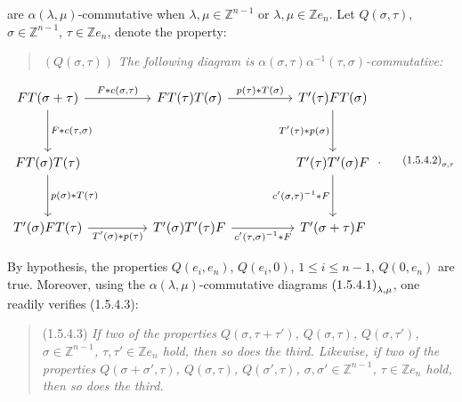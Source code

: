 %
are $\alpha(\lambda,\mu)$-commutative when
$\lambda,\mu\in\mathbb Z^{n-1}$ or
$\lambda,\mu\in\mathbb Z e_n$. Let $Q(\sigma,\tau)$,
$\sigma\in\mathbb Z^{n-1}$, $\tau\in\mathbb Z e_n$, denote the
property:

\begin{quote}
  \noindent\textup{$(Q(\sigma,\tau))$}\quad
  \emph{The following diagram is
  $\alpha(\sigma,\tau)\alpha^{-1}(\tau,\sigma)$-commutative:}
\end{quote}

\begin{equation}
  \resizebox{0.98\textwidth}{!}{%
    $\begin{tikzcd}[ampersand replacement=\&,column sep=4.5em,row sep=3.2em]
      FT(\sigma+\tau)
        \arrow[r,"{F*c(\sigma,\tau)}"]
        \arrow[d,"{F*c(\tau,\sigma)}"]
        \& FT(\tau)T(\sigma)
        \arrow[r,"{p(\tau)*T(\sigma)}"]
        \& T'(\tau)FT(\sigma)
        \arrow[d,"{T'(\tau)*p(\sigma)}"'] \\
      FT(\sigma)T(\tau)
        \arrow[d,"{p(\sigma)*T(\tau)}"]
        \& {}
        \& T'(\tau)T'(\sigma)F
        \arrow[d,"{c'(\sigma,\tau)^{-1}*F}"'] \\
      T'(\sigma)FT(\tau)
        \arrow[r,"{T'(\sigma)*p(\tau)}"']
        \& T'(\sigma)T'(\tau)F
        \arrow[r,"{c'(\tau,\sigma)^{-1}*F}"']
        \& T'(\sigma+\tau)F
    \end{tikzcd}$%
  }\;.
  \tag*{\(\textup{(1.5.4.2)}_{\sigma,\tau}\)}
\end{equation}

By hypothesis, the properties
$Q(e_i,e_n)$, $Q(e_i,0)$, $1\leq i\leq n-1$, $Q(0,e_n)$
are true. Moreover, using the
$\alpha(\lambda,\mu)$-commutative diagrams
$\textup{(1.5.4.1)}_{\lambda,\mu}$, one readily verifies
(1.5.4.3):

\begin{quote}
  \noindent\textup{(1.5.4.3)}\quad
  \emph{If two of the properties
  $Q(\sigma,\tau+\tau')$, $Q(\sigma,\tau)$, $Q(\sigma,\tau')$,
  $\sigma\in\mathbb Z^{n-1}$, $\tau,\tau'\in\mathbb Z e_n$
  hold, then so does the third. Likewise, if two of the properties
  $Q(\sigma+\sigma',\tau)$, $Q(\sigma,\tau)$,
  $Q(\sigma',\tau)$, $\sigma,\sigma'\in\mathbb Z^{n-1}$,
  $\tau\in\mathbb Z e_n$ hold, then so does the third.}
\end{quote}

